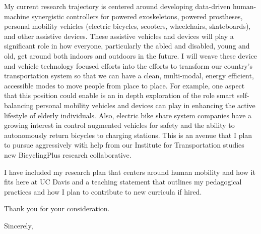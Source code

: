 \documentclass{letter}
\begin{document}
\begin{letter}
My current research trajectory is centered around developing data-driven
human-machine synergistic controllers for powered exoskeletons, powered
prostheses, personal mobility vehicles (electric bicycles, scooters,
wheelchairs, skateboards), and other assistive devices. These assistive
vehicles and devices will play a significant role in how everyone, particularly
the abled and disabled, young and old, get around both indoors and outdoors in
the future. I will weave these device and vehicle technology focused efforts
into the efforts to transform our country's transportation system so that we
can have a clean, multi-modal, energy efficient, accessible modes to move
people from place to place. For example, one aspect that this position could
enable is an in depth exploration of the role smart self-balancing personal
mobility vehicles and devices can play in enhancing the active lifestyle of
elderly individuals. Also, electric bike share system companies have a growing
interest in control augmented vehicles for safety and the ability to
autonomously return bicycles to charging stations. This is an avenue that I
plan to pursue aggressively with help from our Institute for Transportation
studies new BicyclingPlus research collaborative.

I have included my research plan that centers around human mobility and how it
fits here at UC Davis and a teaching statement that outlines my pedagogical
practices and how I plan to contribute to new curricula if hired.

Thank you for your consideration.

\closing{Sincerely,}

\end{letter}
\end{document}
